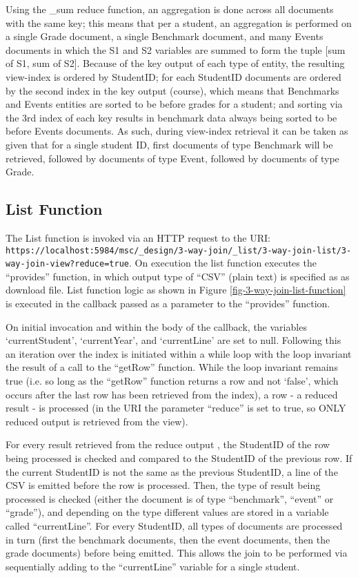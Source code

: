 Using the \_sum reduce function, an aggregation is done across all documents with the same key; this means that per a student, an aggregation is performed on a single Grade document, a single Benchmark document, and many Events documents in which the S1 and S2 variables are summed to form the tuple [sum of S1, sum of S2]. Because of the key output of each type of entity, the resulting view-index is ordered by StudentID; for each StudentID documents are ordered by the second index in the key output (course), which means that Benchmarks and Events entities are sorted to be before grades for a student; and sorting via the 3rd index of each key results in benchmark data always being sorted to be before Events documents. As such, during view-index retrieval it can be taken as given that for a single student ID, first documents of type Benchmark will be retrieved, followed by documents of type Event, followed by documents of type Grade.

\subsection{List Function}
The List function is invoked via an HTTP request to the URI: \texttt{https://localhost:5984/msc/\_design/3-way-join/\_list/3-way-join-list/3-way-join-view?reduce=true}. On execution the list function executes the ``provides'' function, in which output type of ``CSV'' (plain text) is specified as as download file. List function logic as shown in Figure \ref{fig-3-way-join-list-function} is executed in the callback passed as a parameter to the ``provides'' function.

On initial invocation and within the body of the callback, the variables `currentStudent', `currentYear', and `currentLine' are set to null. Following this an iteration over the index is initiated within a while loop with the loop invariant the result of a call to the ``getRow'' function. While the loop invariant remains true (i.e. so long as the ``getRow'' function returns a row and not `false', which occurs after the last row has been retrieved from the index), a row - a reduced result - is processed (in the URI the parameter ``reduce'' is set to true, so ONLY reduced output is retrieved from the view).

For every result retrieved from the reduce output , the StudentID of the row being processed is checked and compared to the StudentID of the previous row. If the current StudentID is not the same as the previous StudentID, a line of the CSV is emitted before the row is processed. Then, the type of result being processed is checked (either the document is of type ``benchmark'', ``event'' or ``grade''), and depending on the type different values are stored in a variable called ``currentLine''. For every StudentID, all types of documents are processed in turn (first the benchmark documents, then the event documents, then the grade documents) before being emitted. This allows the join to be performed via sequentially adding to the ``currentLine'' variable for a single student.

